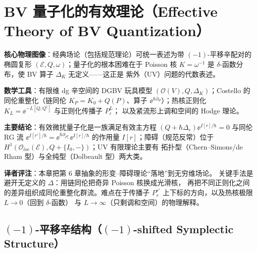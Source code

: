 

\section{BV 量子化的有效理论（Effective Theory of BV Quantization）}

\begin{keypoints}
  \item \textbf{核心物理图像}：经典场论（包括规范理论）可统一表述为带 $(-1)$-平移辛配对的
        椭圆复形 $(\mathcal{E},Q,\omega)$；量子化的根本困难在于 Poisson 核
        $K=\omega^{-1}$ 是 $\delta$-函数分布，使 BV 算子 $\Delta_K$ 无定义——这正是
        紫外（UV）问题的代数表述。
  \item \textbf{数学工具}：有限维 dg 辛空间的 DGBV 玩具模型
        $(\mathcal{O}(V),Q,\Delta_K)$；Costello 的同伦重整化（链同伦
        $K_P=K_0+Q(P)$、算子 $\ee^{\hbar\partial_P}$）；热核正则化
        $K_L=\ee^{-L[Q,Q^{\dagger}]}$ 与正则化传播子 $P^L_{\varepsilon}$；
        以及紧流形上调和空间的 Hodge 理论。
  \item \textbf{主要结论}：有效微扰量子化是一族满足有效主方程
        $(Q+\hbar\Delta_r)\ee^{I[r]/\hbar}=0$ 与同伦 RG 流
        $\ee^{I[r']/\hbar}=\ee^{\hbar\partial_{P^{r'}_r}}\ee^{I[r]/\hbar}$ 的作用量
        $I[r]$；障碍（规范反常）位于
        $H^1(\mathcal{O}_{loc}(\mathcal{E}),Q+\{I_0,-\})$；UV 有限理论主要有
        拓扑型（Chern--Simons/de Rham 型）与全纯型（Dolbeault 型）两大类。
  \item \textbf{译者评注}：本章把第 6 章抽象的形变–障碍理论“落地”到无穷维场论。
        关键手法是避开无定义的 $\Delta$：用链同伦把奇异 Poisson 核换成光滑核，
        再把不同正则化之间的差异组织成同伦重整化群流。难点在于传播子
        $P^{r'}_r$ 上下标的方向，以及热核极限 $L\to 0$（回到 $\delta$-函数）
        与 $L\to\infty$（只剩调和空间）的物理解释。
\end{keypoints}

\subsection{$(-1)$-平移辛结构（$(-1)$-shifted Symplectic Structure）}

